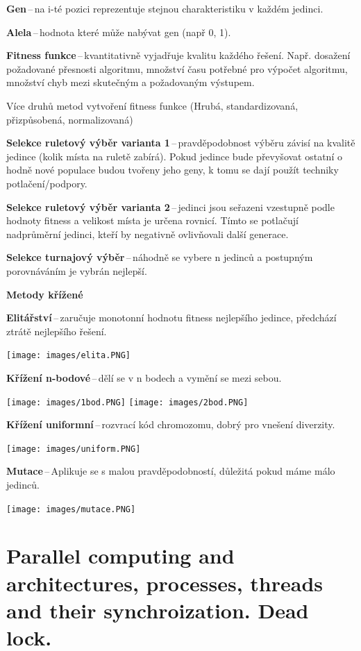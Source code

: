 \textbf{Gen}\,--\,na i-té pozici reprezentuje stejnou charakteristiku v každém jedinci.

\textbf{Alela}\,--\,hodnota které může nabývat gen (např 0, 1).

\textbf{Fitness funkce}\,--\,kvantitativně vyjadřuje kvalitu každého řešení. Např. dosažení požadované přesnosti algoritmu, množství času potřebné pro výpočet algoritmu, množství chyb mezi skutečným a požadovaným výstupem.

Více druhů metod vytvoření fitness funkce (Hrubá, standardizovaná, přizpůsobená, normalizovaná)

\textbf{Selekce ruletový výběr varianta 1}\,--\,pravděpodobnost výběru závisí na kvalitě jedince (kolik místa na ruletě zabírá). Pokud jedince bude převyšovat ostatní o hodně nové populace budou tvořeny jeho geny, k tomu se dají použít techniky potlačení/podpory.

\textbf{Selekce ruletový výběr varianta 2}\,--\,jedinci jsou seřazeni vzestupně podle hodnoty fitness a velikost místa je určena rovnicí. Tímto se potlačují nadprůměrní jedinci, kteří by negativně ovlivňovali další generace.

\textbf{Selekce turnajový výběr}\,--\,náhodně se vybere n jedinců a postupným porovnáváním je vybrán nejlepší.

\begin{Large}\vspace{0,5cm} \textbf{Metody křížené}
\end{Large}

\textbf{Elitářství}\,--\,zaručuje monotonní hodnotu fitness nejlepšího jedince, předchází ztrátě nejlepšího řešení.

\begin{center}
\texttt{[image: images/elita.PNG]}
\end{center}

\textbf{Křížení n-bodové}\,--\,dělí se v n bodech a vymění se mezi sebou.

\begin{center}
\texttt{[image: images/1bod.PNG]}
\texttt{[image: images/2bod.PNG]}

\end{center}

\textbf{Křížení uniformní}\,--\,rozvrací kód chromozomu, dobrý pro vnešení diverzity.

\begin{center}
\texttt{[image: images/uniform.PNG]}
\end{center}

\textbf{Mutace}\,--\,Aplikuje se s malou pravděpodobností, důležitá pokud máme málo jedinců.

\begin{center}
\texttt{[image: images/mutace.PNG]}
\end{center}



\section{Parallel computing and architectures, processes, threads and their synchroization. Dead lock.}